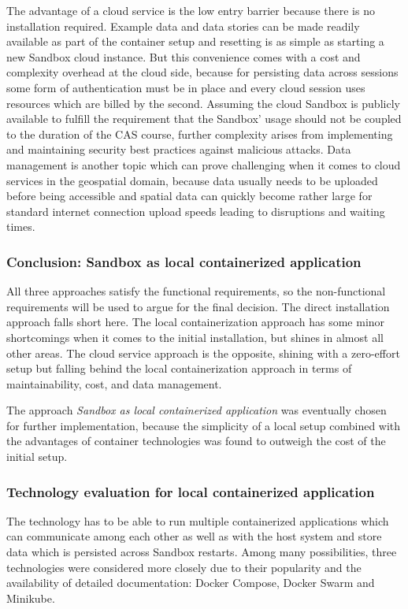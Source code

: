 \documentclass[11pt, a4paper, oneside, parskip=full-]{scrartcl}
\begin{document}
The advantage of a cloud service is the low entry barrier because there is no
installation required. Example data and data stories can be made readily
available as part of the container setup and resetting is as simple as starting
a new Sandbox cloud instance. But this convenience comes with a cost and
complexity overhead at the cloud side, because for persisting data across
sessions some form of authentication must be in place and every cloud session
uses resources which are billed by the second. Assuming the cloud Sandbox is
publicly available to fulfill the requirement that the Sandbox' usage should not
be coupled to the duration of the CAS course, further complexity arises from
implementing and maintaining security best practices against malicious attacks.
Data management is another topic which can prove challenging when it comes to
cloud services in the geospatial domain, because data usually needs to be
uploaded before being accessible and spatial data can quickly become rather
large for standard internet connection upload speeds leading to disruptions and
waiting times.

\subsubsection*{Conclusion: Sandbox as local containerized application}
All three approaches satisfy the functional requirements, so the non-functional
requirements will be used to argue for the final decision. The direct
installation approach falls short here. The local containerization approach has
some minor shortcomings when it comes to the initial installation, but shines in
almost all other areas. The cloud service approach is the opposite, shining with
a zero-effort setup but falling behind the local containerization approach in
terms of maintainability, cost, and data management.

The approach \emph{Sandbox as local containerized application} was eventually
chosen for further implementation, because the simplicity of a local setup
combined with the advantages of container technologies was found to outweigh the
cost of the initial setup.

\subsubsection{Technology evaluation for local containerized application}
The technology has to be able to run multiple containerized applications which
can communicate among each other as well as with the host system and store data
which is persisted across Sandbox restarts. Among many possibilities, three
technologies were considered more closely due to their popularity and the
availability of detailed documentation: Docker Compose, Docker Swarm and
Minikube.
\end{document}
